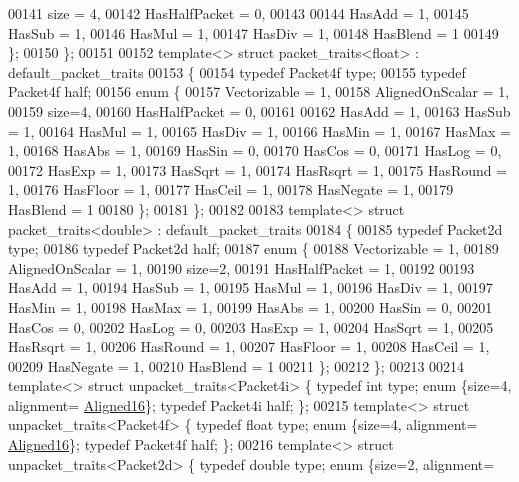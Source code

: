 \begin{DoxyCode}
{00141     size = 4,
00142     HasHalfPacket = 0,
00143 
00144     HasAdd  = 1,
00145     HasSub  = 1,
00146     HasMul  = 1,
00147     HasDiv  = 1,
00148     HasBlend = 1
00149   \};
00150 \};
00151 
00152 \textcolor{keyword}{template}<> \textcolor{keyword}{struct }packet\_traits<float> : default\_packet\_traits
00153 \{
00154   \textcolor{keyword}{typedef} Packet4f type;
00155   \textcolor{keyword}{typedef} Packet4f half;
00156   \textcolor{keyword}{enum} \{
00157     Vectorizable = 1,
00158     AlignedOnScalar = 1,
00159     size=4,
00160     HasHalfPacket = 0,
00161 
00162     HasAdd  = 1,
00163     HasSub  = 1,
00164     HasMul  = 1,
00165     HasDiv  = 1,
00166     HasMin  = 1,
00167     HasMax  = 1,
00168     HasAbs  = 1,
00169     HasSin  = 0,
00170     HasCos  = 0,
00171     HasLog  = 0,
00172     HasExp  = 1,
00173     HasSqrt = 1,
00174     HasRsqrt = 1,
00175     HasRound = 1,
00176     HasFloor = 1,
00177     HasCeil = 1,
00178     HasNegate = 1,
00179     HasBlend = 1
00180   \};
00181 \};
00182 
00183 \textcolor{keyword}{template}<> \textcolor{keyword}{struct }packet\_traits<double> : default\_packet\_traits
00184 \{
00185   \textcolor{keyword}{typedef} Packet2d type;
00186   \textcolor{keyword}{typedef} Packet2d half;
00187   \textcolor{keyword}{enum} \{
00188     Vectorizable = 1,
00189     AlignedOnScalar = 1,
00190     size=2,
00191     HasHalfPacket = 1,
00192 
00193     HasAdd  = 1,
00194     HasSub  = 1,
00195     HasMul  = 1,
00196     HasDiv  = 1,
00197     HasMin  = 1,
00198     HasMax  = 1,
00199     HasAbs  = 1,
00200     HasSin  = 0,
00201     HasCos  = 0,
00202     HasLog  = 0,
00203     HasExp  = 1,
00204     HasSqrt = 1,
00205     HasRsqrt = 1,
00206     HasRound = 1,
00207     HasFloor = 1,
00208     HasCeil = 1,
00209     HasNegate = 1,
00210     HasBlend = 1
00211   \};
00212 \};
00213 
00214 \textcolor{keyword}{template}<> \textcolor{keyword}{struct }unpacket\_traits<Packet4i> \{ \textcolor{keyword}{typedef} \textcolor{keywordtype}{int}    type; \textcolor{keyword}{enum} \{size=4, alignment=
      \hyperlink{group__enums_gga45fe06e29902b7a2773de05ba27b47a1af8e2bf74b04c02199f62c5e3c06dbfcc}{Aligned16}\}; \textcolor{keyword}{typedef} Packet4i half; \};
00215 \textcolor{keyword}{template}<> \textcolor{keyword}{struct }unpacket\_traits<Packet4f> \{ \textcolor{keyword}{typedef} \textcolor{keywordtype}{float}  type; \textcolor{keyword}{enum} \{size=4, alignment=
      \hyperlink{group__enums_gga45fe06e29902b7a2773de05ba27b47a1af8e2bf74b04c02199f62c5e3c06dbfcc}{Aligned16}\}; \textcolor{keyword}{typedef} Packet4f half; \};
00216 \textcolor{keyword}{template}<> \textcolor{keyword}{struct }unpacket\_traits<Packet2d> \{ \textcolor{keyword}{typedef} \textcolor{keywordtype}{double} type; \textcolor{keyword}{enum} \{size=2, alignment=
}
\end{DoxyCode}
